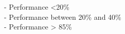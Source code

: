 {\begin{tikzpicture}[text=black,font=\normalsize]
            \end{tikzpicture} \\
        \medskip     
        \vspace{1cm}
        \centering
        \\
        \vspace{0.5cm}
        \parbox[c]{7cm}{
        \begin{normalsize}
        \RaggedRight
         - Performance <20\% \\
        \vspace{0.2cm}
         - Performance between 20\% and 40\% \\
        \vspace{0.2cm}
         - Performance > 85\%
        
        \end{normalsize}}                                         
    }
